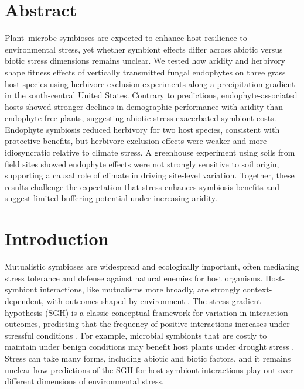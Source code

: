 \documentclass[12pt]{article}\usepackage[]{graphicx}\usepackage[dvipsnames]{xcolor}
\begin{document}
\newpage
\linenumbers
\section*{Abstract}
Plant–microbe symbioses are expected to enhance host resilience to environmental stress, yet whether symbiont effects differ across abiotic versus biotic stress dimensions remains unclear. 
We tested how aridity and herbivory shape fitness effects of vertically transmitted fungal endophytes on three grass host species using herbivore exclusion experiments along a precipitation gradient in the south-central United States. 
Contrary to predictions, endophyte-associated hosts showed stronger declines in demographic performance with aridity than endophyte-free plants, suggesting abiotic stress exacerbated symbiont costs. 
Endophyte symbiosis reduced herbivory for two host species, consistent with protective benefits, but herbivore exclusion effects were weaker and more idiosyncratic relative to climate stress. 
A greenhouse experiment using soils from field sites showed endophyte effects were not strongly sensitive to soil origin, supporting a causal role of climate in driving site-level variation. 
Together, these results challenge the expectation that stress enhances symbiosis benefits and suggest limited buffering potential under increasing aridity.
\bigskip

\newpage
\section*{Introduction}
Mutualistic symbioses are widespread and ecologically important, often mediating stress tolerance and defense against natural enemies for host organisms. 
Host-symbiont interactions, like mutualisms more broadly, are strongly context-dependent, with outcomes shaped by environment \citep{hoeksema2015context, bronstein1994conditional,hoang2024impacts,rudgers2020climate}. 
The stress-gradient hypothesis (SGH) is a classic conceptual framework for variation in interaction outcomes, predicting that the frequency of positive interactions increases under stressful conditions \citep{louthan2015and,bertness1994positive,holmgren2010strong,maestre2009refining}.
For example, microbial symbionts that are costly to maintain under benign conditions may benefit host plants under drought stress  \citep{giauque2019endophyte}. 
Stress can take many forms, including abiotic and biotic factors, and it remains unclear how predictions of the SGH for host-symbiont interactions play out over different dimensions of environmental stress. 
\end{document}
